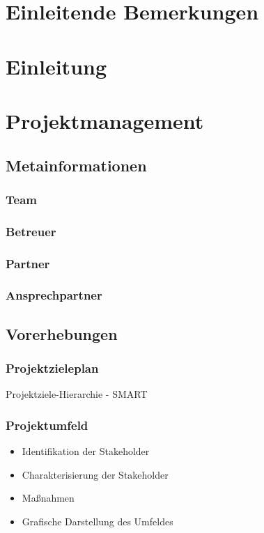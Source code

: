 \def \currentAuthor {} %

\chapter*{Einleitende Bemerkungen}

\chapter{Einleitung}

\chapter{Projektmanagement}

\section{Metainformationen}
\subsection{Team}
\subsection{Betreuer}
\subsection{Partner}
\subsection{Ansprechpartner}
\section{Vorerhebungen}
\subsection{Projektzieleplan}
Projektziele-Hierarchie - SMART
\subsection{Projektumfeld}
\begin{itemize}
	\item Identifikation der Stakeholder
	\item Charakterisierung der Stakeholder
	\item Maßnahmen
	\item Grafische Darstellung des Umfeldes
\end{itemize}
